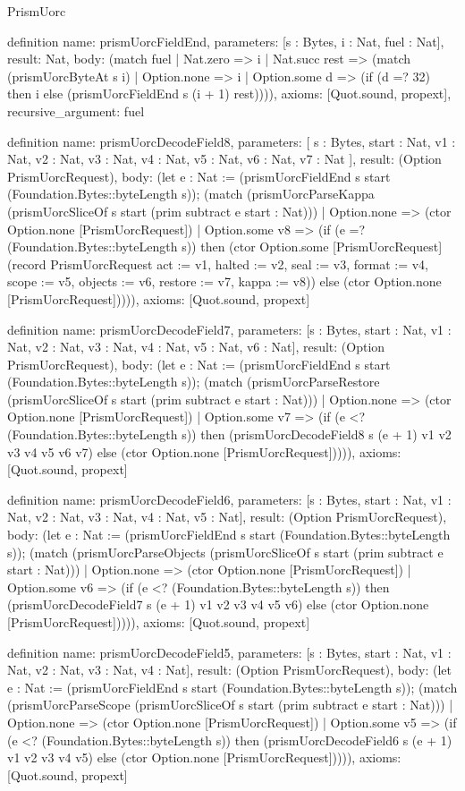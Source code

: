 \begin{lexlean}{PrismUorc}
\begin{semanticmodule}
definition{
  name: prismUorcFieldEnd,
  parameters: [s : Bytes, i : Nat, fuel : Nat],
  result: Nat,
  body: (match fuel
    | Nat.zero => i
    | Nat.succ rest => (match (prismUorcByteAt s i)
      | Option.none => i
      | Option.some d => (if (d =? 32) then i else (prismUorcFieldEnd s (i + 1) rest)))),
  axioms: [Quot.sound, propext],
  recursive_argument: fuel
}

definition{
  name: prismUorcDecodeField8,
  parameters: [
    s : Bytes,
    start : Nat,
    v1 : Nat,
    v2 : Nat,
    v3 : Nat,
    v4 : Nat,
    v5 : Nat,
    v6 : Nat,
    v7 : Nat
  ],
  result: (Option PrismUorcRequest),
  body: (let e : Nat := (prismUorcFieldEnd s start (Foundation.Bytes::byteLength s)); (match (prismUorcParseKappa (prismUorcSliceOf s start (prim subtract e start : Nat)))
    | Option.none => (ctor Option.none [PrismUorcRequest])
    | Option.some v8 => (if (e =? (Foundation.Bytes::byteLength s)) then (ctor Option.some [PrismUorcRequest] (record PrismUorcRequest {act := v1, halted := v2, seal := v3, format := v4, scope := v5, objects := v6, restore := v7, kappa := v8})) else (ctor Option.none [PrismUorcRequest])))),
  axioms: [Quot.sound, propext]
}

definition{
  name: prismUorcDecodeField7,
  parameters: [s : Bytes, start : Nat, v1 : Nat, v2 : Nat, v3 : Nat, v4 : Nat, v5 : Nat, v6 : Nat],
  result: (Option PrismUorcRequest),
  body: (let e : Nat := (prismUorcFieldEnd s start (Foundation.Bytes::byteLength s)); (match (prismUorcParseRestore (prismUorcSliceOf s start (prim subtract e start : Nat)))
    | Option.none => (ctor Option.none [PrismUorcRequest])
    | Option.some v7 => (if (e <? (Foundation.Bytes::byteLength s)) then (prismUorcDecodeField8 s (e + 1) v1 v2 v3 v4 v5 v6 v7) else (ctor Option.none [PrismUorcRequest])))),
  axioms: [Quot.sound, propext]
}

definition{
  name: prismUorcDecodeField6,
  parameters: [s : Bytes, start : Nat, v1 : Nat, v2 : Nat, v3 : Nat, v4 : Nat, v5 : Nat],
  result: (Option PrismUorcRequest),
  body: (let e : Nat := (prismUorcFieldEnd s start (Foundation.Bytes::byteLength s)); (match (prismUorcParseObjects (prismUorcSliceOf s start (prim subtract e start : Nat)))
    | Option.none => (ctor Option.none [PrismUorcRequest])
    | Option.some v6 => (if (e <? (Foundation.Bytes::byteLength s)) then (prismUorcDecodeField7 s (e + 1) v1 v2 v3 v4 v5 v6) else (ctor Option.none [PrismUorcRequest])))),
  axioms: [Quot.sound, propext]
}

definition{
  name: prismUorcDecodeField5,
  parameters: [s : Bytes, start : Nat, v1 : Nat, v2 : Nat, v3 : Nat, v4 : Nat],
  result: (Option PrismUorcRequest),
  body: (let e : Nat := (prismUorcFieldEnd s start (Foundation.Bytes::byteLength s)); (match (prismUorcParseScope (prismUorcSliceOf s start (prim subtract e start : Nat)))
    | Option.none => (ctor Option.none [PrismUorcRequest])
    | Option.some v5 => (if (e <? (Foundation.Bytes::byteLength s)) then (prismUorcDecodeField6 s (e + 1) v1 v2 v3 v4 v5) else (ctor Option.none [PrismUorcRequest])))),
  axioms: [Quot.sound, propext]
}


\end{semanticmodule}
\end{lexlean}
